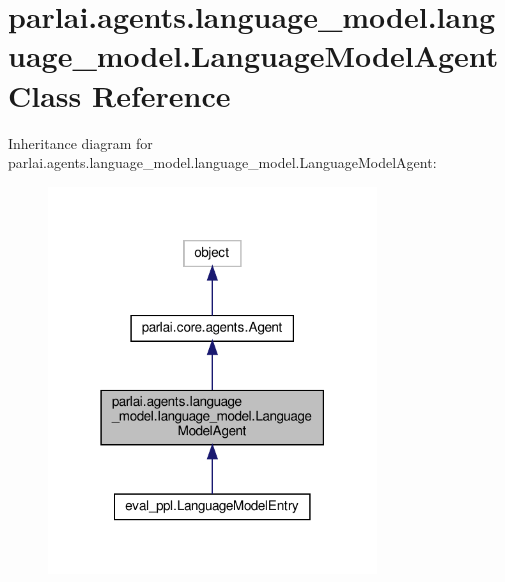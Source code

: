 \hypertarget{classparlai_1_1agents_1_1language__model_1_1language__model_1_1LanguageModelAgent}{}\section{parlai.\+agents.\+language\+\_\+model.\+language\+\_\+model.\+Language\+Model\+Agent Class Reference}
\label{classparlai_1_1agents_1_1language__model_1_1language__model_1_1LanguageModelAgent}


Inheritance diagram for parlai.\+agents.\+language\+\_\+model.\+language\+\_\+model.\+Language\+Model\+Agent\+:
\nopagebreak
\begin{figure}[H]
\begin{center}
\leavevmode
\includegraphics[width=247pt]{classparlai_1_1agents_1_1language__model_1_1language__model_1_1LanguageModelAgent__inherit__graph}
\end{center}
\end{figure}


